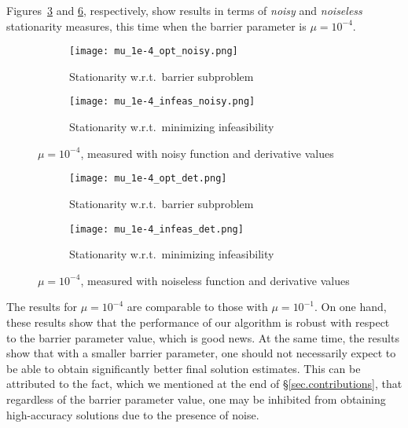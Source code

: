 Figures~\ref{fig:mu_1e-4_noisy} and \ref{fig:mu_1e-4_det}, respectively, show results in terms of \emph{noisy} and \emph{noiseless} stationarity measures, this time when the barrier parameter is $\mu = 10^{-4}$.

\begin{figure}[ht]
\centering
\begin{subfigure}{.5\textwidth}
  \centering
  \texttt{[image: mu\_1e-4\_opt\_noisy.png]}
  \caption{Stationarity w.r.t.~barrier subproblem}
  \label{fig:opt_mu_1e-4_noisy}
\end{subfigure}%
\begin{subfigure}{.5\textwidth}
  \centering
  \texttt{[image: mu\_1e-4\_infeas\_noisy.png]}
  \caption{Stationarity w.r.t.~minimizing infeasibility}
  \label{fig:infeas_mu_1e-4_noisy}
\end{subfigure}
\caption{$\mu=10^{-4}$, measured with noisy function and derivative values}
\label{fig:mu_1e-4_noisy}
\end{figure} 

\begin{figure}[ht]
\centering
\begin{subfigure}{.5\textwidth}
  \centering
  \texttt{[image: mu\_1e-4\_opt\_det.png]}
  \caption{Stationarity w.r.t.~barrier subproblem}
  \label{fig:opt_mu_1e-4_det}
\end{subfigure}%
\begin{subfigure}{.5\textwidth}
  \centering
  \texttt{[image: mu\_1e-4\_infeas\_det.png]}
  \caption{Stationarity w.r.t.~minimizing infeasibility}
  \label{fig:infeas_mu_1e-4_det}
\end{subfigure}
\caption{$\mu=10^{-4}$, measured with noiseless function and derivative values}
\label{fig:mu_1e-4_det}
\end{figure}

The results for $\mu = 10^{-4}$ are comparable to those with $\mu = 10^{-1}$.  On one hand, these results show that the performance of our algorithm is robust with respect to the barrier parameter value, which is good news.  At the same time, the results show that with a smaller barrier parameter, one should not necessarily expect to be able to obtain significantly better final solution estimates.  This can be attributed to the fact, which we mentioned at the end of \S\ref{sec.contributions}, that regardless of the barrier parameter value, one may be inhibited from obtaining high-accuracy solutions due to the presence of noise.

